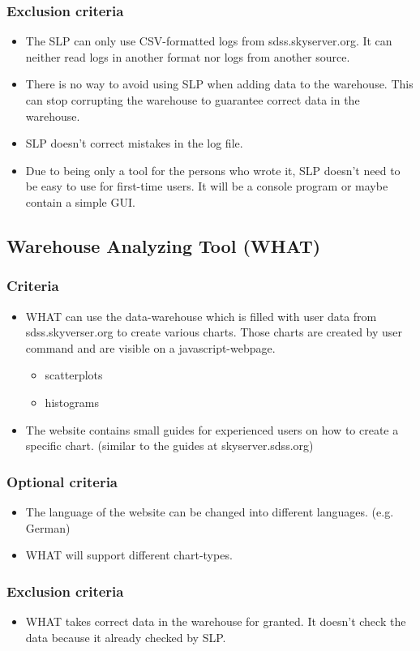 \subsubsection{Exclusion criteria}
\begin{itemize}
\item The SLP can only use CSV-formatted logs from sdss.skyserver.org. 
It can neither read logs in another format nor logs
from another source.
\item There is no way to avoid using SLP when adding data to the warehouse. 
This can stop corrupting the warehouse to guarantee correct data in the warehouse.
\item SLP doesn't correct mistakes in the log file.
\item Due to being only a tool for the persons who wrote it, SLP doesn't need to be easy to use for first-time users.
It will be a console program or maybe contain a simple GUI.
\end{itemize}



\subsection{Warehouse Analyzing Tool (WHAT)}

\subsubsection{Criteria}
\begin{itemize}
\item WHAT can use the data-warehouse which is filled with user data  
from sdss.skyverser.org to create various charts. 
Those charts are created by user command and are visible on a javascript-webpage.
\begin{itemize}
\item scatterplots
\item histograms
\end{itemize}
\item The website contains small guides for experienced users on how to create a specific chart. 
(similar to the guides at skyserver.sdss.org)
\end{itemize}

\subsubsection{Optional criteria}
\begin{itemize}
\item The language of the website can be changed into different languages. (e.g. German)
\item WHAT will support different chart-types.
\end{itemize}

\subsubsection{Exclusion criteria}
\begin{itemize}
\item WHAT takes correct data in the warehouse for granted. It doesn't check the
 data because it already checked by SLP. 
\end{itemize}
